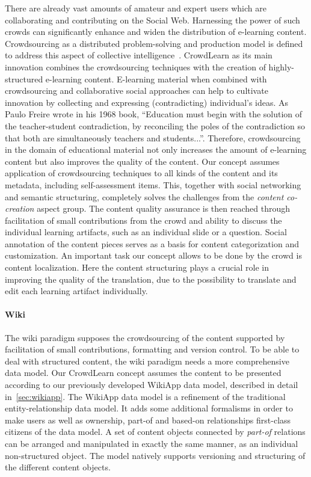 \documentclass[PhD, Submit, ngerman,UKenglish,table]{scrbook}
\begin{document}
There are already vast amounts of amateur and expert users which are collaborating and contributing on the Social Web.
Harnessing the power of such crowds can significantly enhance and widen the distribution of e-learning content.
Crowdsourcing as a distributed problem-solving and production model is defined to address this aspect of collective intelligence~\cite{Howe2006}.
CrowdLearn as its main innovation combines the crowdsourcing techniques with the creation of highly-structured e-learning content.
E-learning material when combined with crowdsourcing and collaborative social approaches can help to cultivate innovation by collecting and expressing (contradicting) individual's ideas.
As Paulo Freire wrote in his 1968 book, ``Education must begin with the solution of the teacher-student contradiction, by reconciling the poles of the contradiction so that both are simultaneously teachers and students...''.
Therefore, crowdsourcing in the domain of educational material not only increases the amount of e-learning content but also improves the quality of the content.
Our concept assumes application of crowdsourcing techniques to all kinds of the content and its metadata, including self-assessment items.
This, together with social networking and semantic structuring, completely solves the challenges from the \emph{content co-creation} aspect group.
The content quality assurance is then reached through facilitation of small contributions from the crowd and ability to discuss the individual learning artifacts, such as an individual slide or a question.
Social annotation of the content pieces serves as a basis for content categorization and customization.
An important task our concept allows to be done by the crowd is content localization.
Here the content structuring plays a crucial role in improving the quality of the translation, due to the possibility to translate and edit each learning artifact individually.


\paragraph{Wiki}

The wiki paradigm supposes the crowdsourcing of the content supported by facilitation of small contributions, formatting and version control.
To be able to deal with structured content, the wiki paradigm needs a more comprehensive data model.
Our CrowdLearn concept assumes the content to be presented according to our previously developed WikiApp data model, described in detail in~\autoref{sec:wikiapp}.
The WikiApp data model is a refinement of the traditional entity-relationship data model.
It adds some additional formalisms in order to make users as well as ownership, part-of and based-on relationships first-class citizens of the data model.
A set of content objects connected by \emph{part-of} relations can be arranged and manipulated in exactly the same manner, as an individual non-structured object.
The model natively supports versioning and structuring of the different content objects.
\end{document}

